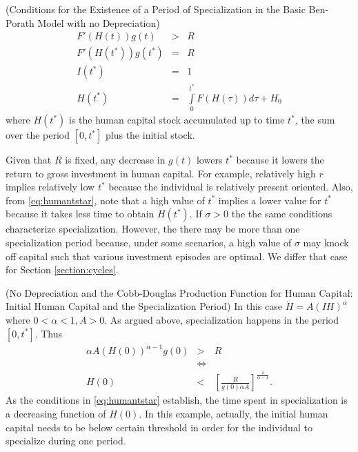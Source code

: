 \begin{condition} (Conditions for the Existence of a Period of Specialization in the Basic Ben-Porath Model with no Depreciation)
\begin{eqnarray}
F'(H(t))g(t) &>& R \nonumber \\
F'(H(t^*))g(t^*) &=& R \nonumber \\
I(t^*) &=& 1 \nonumber \\
H(t^*) &=& \int \limits _{0} ^{t^*} F (H(\tau)) d\tau + H_{0} \label{eq:humantstar}
\end{eqnarray} 
\noindent where $H(t^*)$ is the human capital stock accumulated up to time $t^*$, the sum over the period $[0,t^*]$ plus the initial stock.\\
\end{condition}

\indent Given that $R$ is fixed, any decrease in $g(t)$ lowers $t^*$ because it lowers the return to gross investment in human capital. For example, relatively high $r$ implies relatively low $t^*$ because the individual is relatively present oriented. Also, from \eqref{eq:humantstar}, note that a high value of $t^*$ implies a lower value for $t^*$ because it takes less time to obtain $H(t^*)$. If $\sigma > 0 $ the the same conditions characterize specialization. However, the there may be more than one specialization period because, under some scenarios, a high value of $\sigma$ may knock off capital such that various investment episodes are optimal. We differ that case for Section \ref{section:cycles}.
\begin{case} (No Depreciation and the Cobb-Douglas Production Function for Human Capital: Initial Human Capital and the Specialization Period) \label{case:ndcdexample}
In this case $\dot{H} = A \left(IH \right)^\alpha$ where $0 < \alpha < 1, A>0$. As argued above, specialization happens in the period $[0,t^*]$. Thus
\begin{eqnarray}
	\alpha A \left( H(0) \right) ^{\alpha - 1 }g(0) &>& R \nonumber \\
	&\Leftrightarrow& \nonumber \\
	H(0) &<& \left[ \frac{R}{g(0)\alpha A} \right]^{\frac{1}{\alpha-1}} \label{eq:h0forspe}.
\end{eqnarray}
\indent As the conditions in \eqref{eq:humantstar} establish, the time spent in specialization is a decreasing function of $H(0)$. In this example, actually, the initial human capital needs to be below certain threshold in order for the individual to specialize during one period. 
\end{case}

